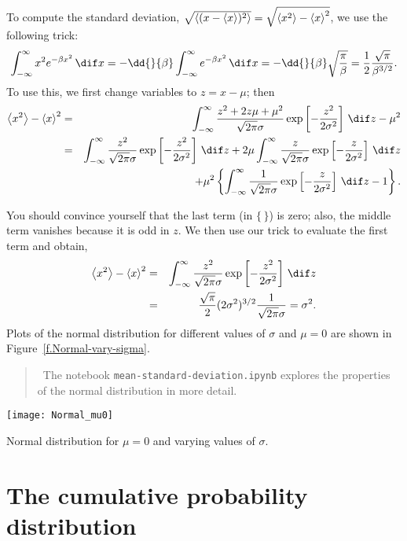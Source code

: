 To compute the standard deviation, $\sqrt{\left\langle(x-\left\langle x\right\rangle)^{2}\right\rangle} = \sqrt{\left\langle x^{2}\right\rangle-\left\langle x\right\rangle^{2}}$, 
we use the following trick:
\[
	\int_{-\infty}^{\infty}x^{2}e^{-\beta x^{2}}\,\dif x 
		= -\dd{}{\beta}\int_{-\infty}^{\infty}e^{-\beta x^{2}}\,\dif x = -\dd{}{\beta}\sqrt{\frac{\pi}{\beta}} = \frac{1}{2}\frac{\sqrt{\pi}}{\beta^{3/2}}.
\]
To use this, we first change variables to $z = x-\mu$; then
\begin{eqnarray*}
	\mean{x^{2}} - \mean{x}^{2} &=& \int_{-\infty}^{\infty}\frac{z^{2}+2z\mu+\mu^{2}}{\sqrt{2\pi}\sigma} \exp\left[-\frac{z^{2}}{2\sigma^{2}}\right]\,\dif z - \mu^{2}\\
		&=& \int_{-\infty}^{\infty}\frac{z^{2}}{\sqrt{2\pi}\sigma} \exp\left[-\frac{z^{2}}{2\sigma^{2}}\right]\,\dif z + 2\mu \int_{-\infty}^{\infty}\frac{z}{\sqrt{2\pi}\sigma} \exp\left[-\frac{z}{2\sigma^{2}}\right]\,\dif z \\
		&& + \mu^{2}\left\{ \int_{-\infty}^{\infty} \frac{1}{\sqrt{2\pi}\sigma} \exp\left[-\frac{z}{2\sigma^{2}}\right]\,\dif z - 1\right\}.
\end{eqnarray*}

\noindent You should convince yourself that the last term (in $\{\,\}$) is zero; also, the middle term vanishes because it is odd in $z$.  We then use our trick to evaluate the first term and obtain,
\begin{eqnarray*}
	\mean{x^{2}} - \mean{x}^{2} &=& \int_{-\infty}^{\infty}\frac{z^{2}}{\sqrt{2\pi}\sigma} \exp\left[-\frac{z^{2}}{2\sigma^{2}}\right]\,\dif z \\
	&=& \frac{\sqrt{\pi}}{2}(2\sigma^{2})^{3/2}\frac{1}{\sqrt{2\pi}\sigma} = \sigma^{2}.
\end{eqnarray*}
Plots of the normal distribution for different values of $\sigma$ and $\mu=0$ are shown in Figure~\ref{f.Normal-vary-sigma}.
\begin{quote}
\notebook\ The notebook \texttt{mean-standard-deviation.ipynb} explores the properties of the normal distribution in more detail.
\end{quote}

\begin{marginfigure}
\texttt{[image: Normal\_mu0]}
\caption[Normal distributions with different standard deviations]{Normal distribution for $\mu=0$ and varying values of $\sigma$.}
\label{f.Normal-vary-sigma}
\end{marginfigure}

\section{The cumulative probability distribution}

